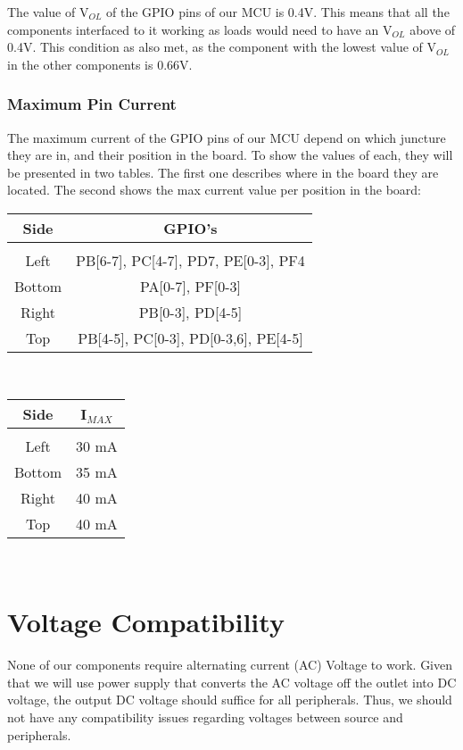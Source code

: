 \documentclass[11pt]{article}
\begin{document}
The value of V$_{OL}$ of the GPIO pins of our MCU is 0.4V. This means that all the components interfaced to it working as loads would need to have an V$_{OL}$ above of 0.4V. This condition as also met, as the component with the lowest value of V$_{OL}$ in the other components is 0.66V.

\section{Maximum Pin Current}

The maximum current of the GPIO pins of our MCU depend on which juncture they are in, and their position in the board. To show the values of each, they will be presented in two tables. The first one describes where in the board they are located. The second shows the max current value per position in the board: \\

\begin{tabular}{|c|c|}
\hline
 Side & GPIO's \\
\hline
&    \\
Left & PB[6-7], PC[4-7], PD7, PE[0-3], PF4 \\
Bottom & PA[0-7], PF[0-3] \\
Right & PB[0-3], PD[4-5] \\
Top & PB[4-5], PC[0-3], PD[0-3,6], PE[4-5] \\

\hline
\end{tabular} \\ 

\begin{tabular}{|c|c|}
\hline
 Side & I$_{MAX}$ \\
\hline
&    \\
Left & 30 mA \\
Bottom & 35 mA \\
Right & 40 mA \\
Top & 40 mA \\

\hline
\end{tabular} \\ 


 

\part{Voltage Compatibility}

None of our components require alternating current (AC) Voltage to work. Given that we will use power supply that converts the AC voltage off the outlet into DC voltage, the output DC voltage should suffice for all peripherals. Thus, we should not have any compatibility issues regarding voltages between source and peripherals. 
\end{document}
